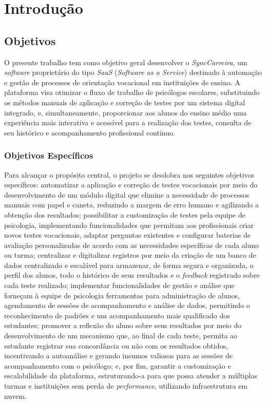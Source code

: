 \chapter{Introdução}

\section{Objetivos}

O presente trabalho tem como objetivo geral desenvolver o \textit{SyncCarreira}, um \textit{software} proprietário do tipo \textit{SaaS} (\textit{Software as a Service}) destinado à automação e gestão de processos de orientação vocacional em instituições de ensino. A plataforma visa otimizar o fluxo de trabalho de psicólogos escolares, substituindo os métodos manuais de aplicação e correção de testes por um sistema digital integrado, e, simultaneamente, proporcionar aos alunos do ensino médio uma experiência mais interativa e acessível para a realização dos testes, consulta de seu histórico e acompanhamento profissional contínuo.

\subsection{Objetivos Específicos}

Para alcançar o propósito central, o projeto se desdobra nos seguintes objetivos específicos: automatizar a aplicação e correção de testes vocacionais por meio do desenvolvimento de um módulo digital que elimine a necessidade de processos manuais com papel e caneta, reduzindo a margem de erro humano e agilizando a obtenção dos resultados; possibilitar a customização de testes pela equipe de psicologia, implementando funcionalidades que permitam aos profissionais criar novos testes vocacionais, adaptar perguntas existentes e configurar baterias de avaliação personalizadas de acordo com as necessidades específicas de cada aluno ou turma; centralizar e digitalizar registros por meio da criação de um banco de dados centralizado e escalável para armazenar, de forma segura e organizada, o perfil dos alunos, todo o histórico de seus resultados e o \textit{feedback} registrado sobre cada teste realizado; implementar funcionalidades de gestão e análise que forneçam à equipe de psicologia ferramentas para administração de alunos, agendamento de sessões de acompanhamento e análise de dados, permitindo o reconhecimento de padrões e um acompanhamento mais qualificado dos estudantes; promover a reflexão do aluno sobre seus resultados por meio do desenvolvimento de um mecanismo que, ao final de cada teste, permita ao estudante registrar sua concordância ou não com os resultados obtidos, incentivando a autoanálise e gerando insumos valiosos para as sessões de acompanhamento com o psicólogo; e, por fim, garantir a customização e escalabilidade da plataforma, estruturando-a para que possa atender a múltiplas turmas e instituições sem perda de \textit{performance}, utilizando infraestrutura em nuvem.

